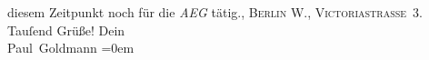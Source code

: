 \begin{ledgroupsized}[t]{13cm}
{{{                  diesem Zeitpunkt noch für die \emph{AEG}
                  tätig.}}}\label{K_L03218-1h}, \textsc{Berlin W.}, \textsc{Victoriastraſse 3}. Tauſend Grüße!\pend
           \pstart
           Dein {\\[\baselineskip]}\spacefill\mbox{Paul Goldmann}\pend
           \leftskip=0em{}
         
         \endnumbering{}\end{ledgroupsized}  \newcommand{\dateiname}{L03218}\newcommand{\titel}{Paul Goldmann an Arthur Schnitzler, 9. 8. 1902}\newcommand{\editorInnen}{Martin Anton Müller und Laura Untner}
      
